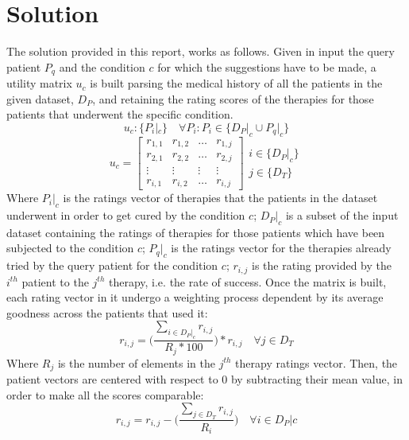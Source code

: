 \section{Solution}
The solution provided in this report, works as follows.
Given in input the query patient $P_q$ and the condition $c$ for which the
suggestions have to be made, a utility matrix $u_c$ is built parsing
the medical history of all the patients in the given dataset, $D_{P}$, and
retaining the rating scores of the therapies for those patients that underwent
the specific condition.
\begin{equation}
		u_c : \{P_{i}|_{c}\} \quad
		\forall P_i :P_i \in \{D_{P}|_{c} \cup P_{q}|_{c}\}
\end{equation}
\begin{equation}
		u_c =
		\begin{bmatrix}
				r_{1,1} & r_{1,2} & \dots & r_{1,j} \\ 
				r_{2,1} & r_{2,2} & \dots & r_{2,j} \\ 
				\vdots & \vdots & \vdots & \vdots \\
				r_{i,1} & r_{i,2} & \dots & r_{i,j} 
		\end{bmatrix}
		\substack{i \in \{D_{P}|_{c}\} \\ j \in \{D_T\}}
\end{equation}
Where $P_i|_{c}$ is the ratings vector of therapies that the patients in the
dataset underwent in order to get cured by the condition $c$;
$D_{P}|_{c}$ is a subset of the input dataset containing the ratings of
therapies for those patients which have been subjected to the condition $c$;
$P_q|_{c}$ is the ratings vector for the therapies already tried by the
query patient for the condition $c$;
$r_{i,j}$ is the rating provided by the $i^{th}$ patient to the $j^{th}$
therapy, i.e. the rate of success. \newline
Once the matrix is built, each rating vector in it undergo a
weighting process dependent by its average goodness across the patients that
used it:
\begin{equation}
		r_{i,j} = \Bigg (\frac{\sum_{i \in D_{P}|_{c}} r_{i,j}}
							  {R_{j}*100}\Bigg) * r_{i,j}	
		\quad
		\forall j \in D_T
\end{equation}
Where $R_{j}$ is the number of elements in the $j^{th}$ therapy ratings
vector.
Then, the patient vectors are centered with respect to 0 by subtracting their
mean value, in order to make all the scores comparable:
\begin{equation}
		r_{i, j} = r_{i, j} - \Bigg(\frac{\sum_{j \in D_T} r_{i,j}}
							  {R_{i}}\Bigg)
		\quad
		\forall i \in D_{P}|c
\end{equation}
